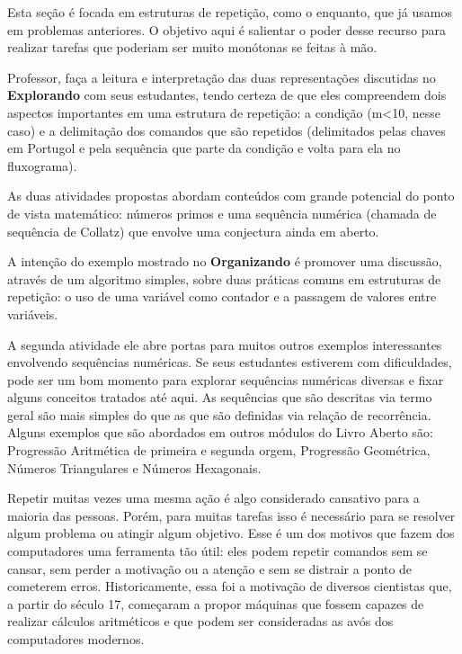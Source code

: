 \def\currentcolor{session1}
\begin{texto}
{
Esta seção é focada em estruturas de repetição, como o enquanto, que já usamos em problemas anteriores. O objetivo aqui é salientar o poder desse recurso para realizar tarefas que poderiam ser muito monótonas se feitas à mão.

Professor, faça a leitura e interpretação das duas representações discutidas no \textbf{Explorando} com seus estudantes, tendo certeza de que eles compreendem dois aspectos importantes em uma estrutura de repetição: a condição (m<10, nesse caso) e a delimitação dos comandos que são repetidos (delimitados pelas chaves em Portugol e pela sequência que parte da condição e volta para ela no fluxograma).

As duas atividades propostas abordam conteúdos com grande potencial do ponto de vista matemático: números primos e uma sequência numérica (chamada de sequência de Collatz) que envolve uma conjectura ainda em aberto.

A intenção do exemplo mostrado no \textbf{Organizando} é promover uma discussão, através de um algoritmo simples, sobre duas práticas comuns em estruturas de repetição: o uso de uma variável como contador e a passagem de valores entre variáveis.

A segunda atividade ele abre portas para muitos outros exemplos interessantes envolvendo sequências numéricas. Se seus estudantes estiverem com dificuldades, pode ser um bom momento para explorar sequências numéricas diversas e fixar alguns conceitos tratados até aqui. As sequências que são descritas via termo geral são mais simples do que as que são definidas via relação de recorrência. Alguns exemplos que são abordados em outros módulos do Livro Aberto são: Progressão Aritmética de primeira e segunda orgem, Progressão Geométrica, Números Triangulares e Números Hexagonais.
}
\end{texto}

\label{comp-exp5}

Repetir muitas vezes uma mesma ação é algo considerado cansativo para a maioria das pessoas. Porém, para muitas tarefas isso é necessário para se resolver algum problema ou atingir algum objetivo. Esse é um dos motivos que fazem dos computadores uma ferramenta tão útil: eles podem repetir comandos sem se cansar, sem perder a motivação ou a atenção e sem se distrair a ponto de cometerem erros. Historicamente, essa foi a motivação de diversos cientistas que, a partir do século 17, começaram a propor máquinas que fossem capazes de realizar cálculos aritméticos e que podem ser consideradas as avós dos computadores modernos.

